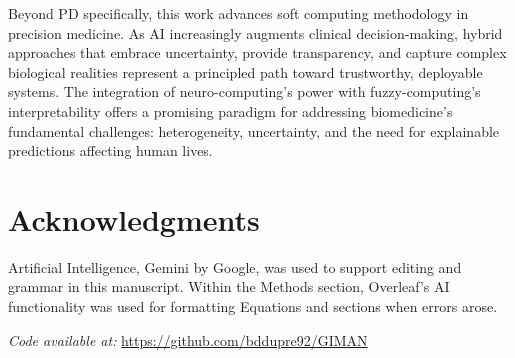 \documentclass[conference]{IEEEtran}
\begin{document}
Beyond PD specifically, this work advances soft computing methodology in precision medicine. As AI increasingly augments clinical decision-making, hybrid approaches that embrace uncertainty, provide transparency, and capture complex biological realities represent a principled path toward trustworthy, deployable systems. The integration of neuro-computing's power with fuzzy-computing's interpretability offers a promising paradigm for addressing biomedicine's fundamental challenges: heterogeneity, uncertainty, and the need for explainable predictions affecting human lives.

\section{Acknowledgments}

Artificial Intelligence, Gemini by Google, was used to support editing and grammar in this manuscript. Within the Methods section, Overleaf's AI functionality was used for formatting Equations and sections when errors arose. 


\textit{Code available at:} \url{https://github.com/bddupre92/GIMAN}
\end{document}
